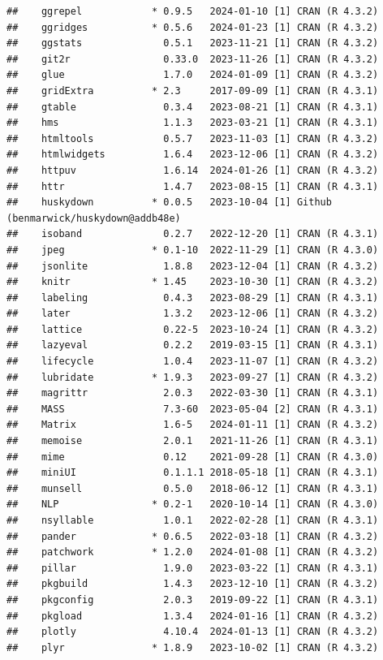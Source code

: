 \documentclass[print]{nuthesis}
\begin{document}
\begin{verbatim}
##    ggrepel            * 0.9.5   2024-01-10 [1] CRAN (R 4.3.2)
##    ggridges           * 0.5.6   2024-01-23 [1] CRAN (R 4.3.2)
##    ggstats              0.5.1   2023-11-21 [1] CRAN (R 4.3.2)
##    git2r                0.33.0  2023-11-26 [1] CRAN (R 4.3.2)
##    glue                 1.7.0   2024-01-09 [1] CRAN (R 4.3.2)
##    gridExtra          * 2.3     2017-09-09 [1] CRAN (R 4.3.1)
##    gtable               0.3.4   2023-08-21 [1] CRAN (R 4.3.1)
##    hms                  1.1.3   2023-03-21 [1] CRAN (R 4.3.1)
##    htmltools            0.5.7   2023-11-03 [1] CRAN (R 4.3.2)
##    htmlwidgets          1.6.4   2023-12-06 [1] CRAN (R 4.3.2)
##    httpuv               1.6.14  2024-01-26 [1] CRAN (R 4.3.2)
##    httr                 1.4.7   2023-08-15 [1] CRAN (R 4.3.1)
##    huskydown          * 0.0.5   2023-10-04 [1] Github (benmarwick/huskydown@addb48e)
##    isoband              0.2.7   2022-12-20 [1] CRAN (R 4.3.1)
##    jpeg               * 0.1-10  2022-11-29 [1] CRAN (R 4.3.0)
##    jsonlite             1.8.8   2023-12-04 [1] CRAN (R 4.3.2)
##    knitr              * 1.45    2023-10-30 [1] CRAN (R 4.3.2)
##    labeling             0.4.3   2023-08-29 [1] CRAN (R 4.3.1)
##    later                1.3.2   2023-12-06 [1] CRAN (R 4.3.2)
##    lattice              0.22-5  2023-10-24 [1] CRAN (R 4.3.2)
##    lazyeval             0.2.2   2019-03-15 [1] CRAN (R 4.3.1)
##    lifecycle            1.0.4   2023-11-07 [1] CRAN (R 4.3.2)
##    lubridate          * 1.9.3   2023-09-27 [1] CRAN (R 4.3.2)
##    magrittr             2.0.3   2022-03-30 [1] CRAN (R 4.3.1)
##    MASS                 7.3-60  2023-05-04 [2] CRAN (R 4.3.1)
##    Matrix               1.6-5   2024-01-11 [1] CRAN (R 4.3.2)
##    memoise              2.0.1   2021-11-26 [1] CRAN (R 4.3.1)
##    mime                 0.12    2021-09-28 [1] CRAN (R 4.3.0)
##    miniUI               0.1.1.1 2018-05-18 [1] CRAN (R 4.3.1)
##    munsell              0.5.0   2018-06-12 [1] CRAN (R 4.3.1)
##    NLP                * 0.2-1   2020-10-14 [1] CRAN (R 4.3.0)
##    nsyllable            1.0.1   2022-02-28 [1] CRAN (R 4.3.1)
##    pander             * 0.6.5   2022-03-18 [1] CRAN (R 4.3.2)
##    patchwork          * 1.2.0   2024-01-08 [1] CRAN (R 4.3.2)
##    pillar               1.9.0   2023-03-22 [1] CRAN (R 4.3.1)
##    pkgbuild             1.4.3   2023-12-10 [1] CRAN (R 4.3.2)
##    pkgconfig            2.0.3   2019-09-22 [1] CRAN (R 4.3.1)
##    pkgload              1.3.4   2024-01-16 [1] CRAN (R 4.3.2)
##    plotly               4.10.4  2024-01-13 [1] CRAN (R 4.3.2)
##    plyr               * 1.8.9   2023-10-02 [1] CRAN (R 4.3.2)

\end{verbatim}
\end{document}
